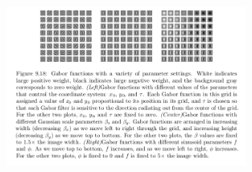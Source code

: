 \documentclass[onecolumn, letterpaper, 12pt]{report}
\begin{document}
\begin{figure}[h]
  \centering
  \includegraphics[width=0.7\textwidth]{gabor.png}
\end{figure}
\end{document}
